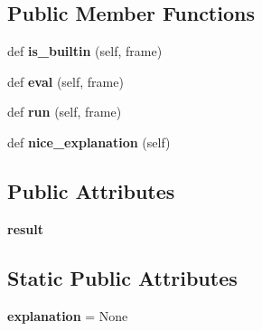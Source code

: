 \subsection*{Public Member Functions}
\begin{DoxyCompactItemize}
\item 
\mbox{\label{classpy_1_1__code_1_1__assertionold_1_1_interpretable_acac9b04cbaad699c2630eb4866497ac5}} 
def {\bfseries is\+\_\+builtin} (self, frame)
\item 
\mbox{\label{classpy_1_1__code_1_1__assertionold_1_1_interpretable_ad77b89842c62cf4ad271935ba10bd960}} 
def {\bfseries eval} (self, frame)
\item 
\mbox{\label{classpy_1_1__code_1_1__assertionold_1_1_interpretable_a1a3d2258a7bc7f1f6b1cf535c14a7384}} 
def {\bfseries run} (self, frame)
\item 
\mbox{\label{classpy_1_1__code_1_1__assertionold_1_1_interpretable_a0abe81e4f9b2373a5e8048ae3cc645ae}} 
def {\bfseries nice\+\_\+explanation} (self)
\end{DoxyCompactItemize}
\subsection*{Public Attributes}
\begin{DoxyCompactItemize}
\item 
\mbox{\label{classpy_1_1__code_1_1__assertionold_1_1_interpretable_a3f3c46a92819e5638a200e98e283d0b5}} 
{\bfseries result}
\end{DoxyCompactItemize}
\subsection*{Static Public Attributes}
\begin{DoxyCompactItemize}
\item 
\mbox{\label{classpy_1_1__code_1_1__assertionold_1_1_interpretable_a26f6d8168aa9e3e5840711978873a815}} 
{\bfseries explanation} = None
\end{DoxyCompactItemize}


